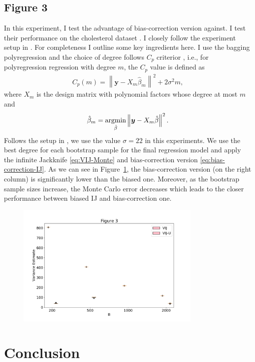 \documentclass[11pt]{article}
\begin{document}
\subsection{Figure 3}
In this experiment, I test the advantage of bias-correction version against.
I test their performance on the cholesterol dataset \cite{efron1991compliance}.
I closely follow the experiment setup in \cite{efron2012model}.
For completeness I outline some key ingredients here.
I use the bagging polyregression and the choice of degree follows $C_p$ criterior \cite{mallows2000some}, i.e., for polyregression regression with degree $m$, the $C_p$ value is defined as
\begin{align*}
	C_{p}(m)=\left\|\boldsymbol{y}-X_{m} \hat{\beta}_{m}\right\|^{2}+2 \sigma^{2} m,
\end{align*}
where $X_m$ is the design matrix with polynomial factors whose degree at most $m$ and 
$$
\hat{\beta}_m = \operatornamewithlimits{argmin}_{\hat{\beta}}\left\|\boldsymbol{y}-X_{m} \hat{\beta}\right\|^{2}.
$$
Follows the setup in \cite{efron2012model}, we use the value $\sigma=22$ in this experiments.
We use the best degree for each bootstrap sample for the final regression model and apply the infinite Jackknife \ref{eq:VIJ-Monte} and bias-correction version \ref{eq:bias-correction-IJ}.
As we can see in Figure~\ref{fig:figure_3}, the bias-correction version (on the right column) is significantly lower than the biased one.
Moreover, as the bootstrap sample sizes increase, the Monte Carlo error decreases which leads to the closer performance between biased IJ and bias-correction one.
\begin{figure}[htbp]
	\label{fig:figure_3}
	\centering
	\includegraphics[width=0.8\textwidth]{../figures/figure_3.pdf}
\end{figure}


\section{Conclusion}

\end{document}
